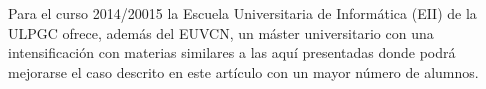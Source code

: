 \documentclass[conference]{IEEEtran}
\begin{document}
Para el curso 2014/20015 la Escuela Universitaria de Informática (EII) de la ULPGC ofrece, además del EUVCN,  un máster universitario con una intensificación con materias similares a las aquí presentadas donde podrá mejorarse el caso descrito en este artículo con un mayor número de alumnos.

 



                                                            




 













\end{document}
